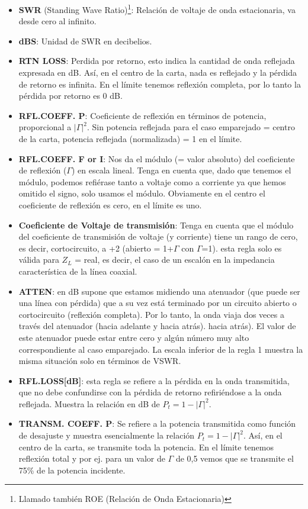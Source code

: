\documentclass[
	12pt, %
	fleqn, %
	a4paper, %
]{LegrandOrangeBook}
\begin{document}
\begin{itemize}
\item \textbf{SWR} (Standing Wave Ratio)\footnote{Llamado también ROE (Relación de Onda Estacionaria)}: Relación de voltaje de onda estacionaria, va desde cero al infinito.
\item \textbf{dBS}: Unidad de SWR en decibelios.
\item \textbf{RTN LOSS}: Perdida por retorno, esto indica
la cantidad de onda reflejada expresada en dB. Así, en el centro de la carta, nada es reflejado y la pérdida de retorno es infinita. En el límite tenemos reflexión completa, por lo tanto la pérdida por retorno es 0 dB.
\item \textbf{RFL.COEFF. P}: Coeficiente de reflexión en
términos de potencia, proporcional a $|\Gamma|^2$. Sin potencia reflejada para el caso emparejado = centro de la carta, potencia reflejada (normalizada) = 1 en el límite.
\item \textbf{RFL.COEFF. F or I}: Nos da el módulo (= valor absoluto) del coeficiente de reflexión ($\Gamma$) en escala lineal. Tenga en cuenta que, dado que tenemos el módulo, podemos refiérase tanto a voltaje como a corriente ya que hemos omitido el signo, solo usamos el módulo. Obviamente en el centro el coeficiente de reflexión es cero, en el límite es uno.
\item \textbf{Coeficiente de Voltaje de transmisión}: Tenga en cuenta que el módulo del coeficiente de transmisión de voltaje (y corriente) tiene un rango de cero, es decir, cortocircuito, a +2 (abierto = 1+$\Gamma$ con $\Gamma$=1). esta regla solo es válida para $Z_L$ = real, es decir, el caso de un escalón en la impedancia característica de la línea coaxial.
\item \textbf{ATTEN}: en dB supone que estamos midiendo una atenuador (que puede ser una línea con pérdida) que a su vez está terminado por un circuito abierto o cortocircuito (reflexión completa). Por lo tanto, la onda viaja dos veces a través del atenuador (hacia adelante y hacia atrás). hacia atrás). El valor de este atenuador puede estar entre cero y algún número muy alto correspondiente al caso emparejado. La escala inferior de la regla 1 muestra la misma situación solo en términos de VSWR.
\item \textbf{RFL.LOSS[dB]}: esta regla se refiere a la pérdida en la onda transmitida, que no debe confundirse con la pérdida de retorno refiriéndose a la onda reflejada. Muestra la relación en dB de $P_t=1-|\Gamma|^2$.
\item \textbf{TRANSM. COEFF. P}: Se refiere a la potencia transmitida como función de desajuste y muestra esencialmente la relación $P_t=1-|\Gamma|^2$. Así, en el centro de la carta, se transmite toda la potencia. En el límite tenemos reflexión total y
por ej. para un valor de $\Gamma$ de 0,5 vemos que se transmite el 75\% de la potencia incidente.
\end{itemize}
\end{document}
